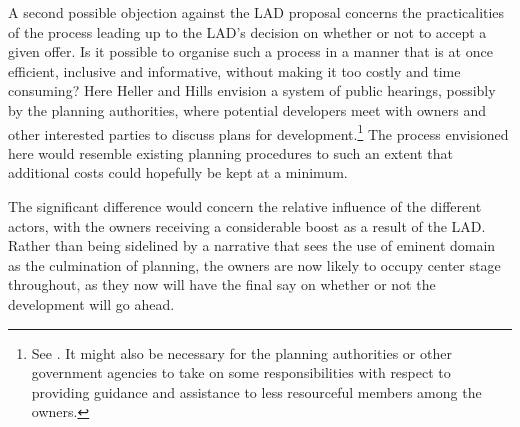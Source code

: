 A second possible objection against the LAD proposal concerns the practicalities of the process leading up to the LAD's decision on whether or not to accept a given offer. Is it possible to organise such a process in a manner that is at once efficient, inclusive and informative, without making it too costly and time consuming? Here Heller and Hills envision a system of public hearings, possibly  by the planning authorities, where potential developers meet with owners and other interested parties to discuss plans for development.\footnote{See \cite[1490-1491]{heller08}. It might also be necessary for the planning authorities or other government agencies to take on some responsibilities with respect to providing guidance and assistance to less resourceful members among the owners.} The process envisioned here would resemble existing planning procedures to such an extent that additional costs could hopefully be kept at a minimum. 

The significant difference would concern the relative influence of the different actors, with the owners receiving a considerable boost as a result of the LAD. Rather than being sidelined by a narrative that sees the use of eminent domain as the culmination of planning, the owners are now likely to occupy center stage throughout, as they now will have the final say on whether or not the development will go ahead.

